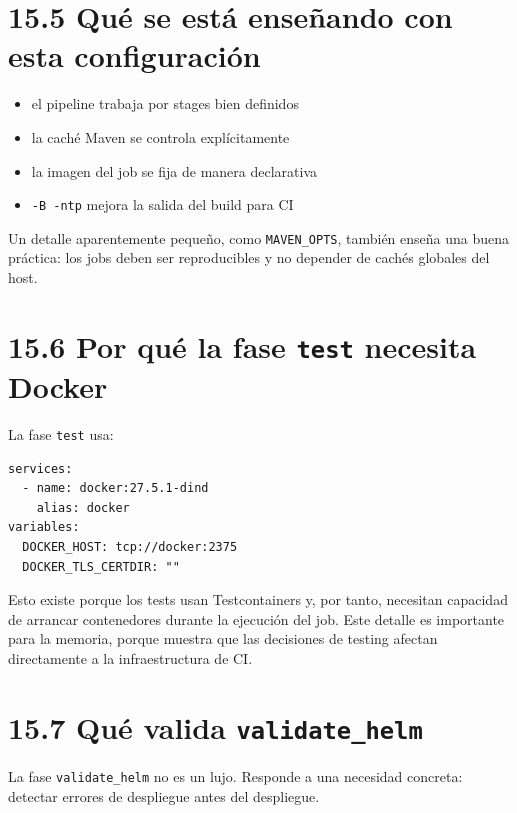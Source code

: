 \documentclass[
a4paper,
12pt]{report}
\providecommand{\tightlist}{%
  \setlength{\itemsep}{0pt}\setlength{\parskip}{0pt}}
\begin{document}
\section{15.5 Qué se está enseñando con esta
configuración}\label{quuxe9-se-estuxe1-enseuxf1ando-con-esta-configuraciuxf3n}

\begin{itemize}
\tightlist
\item
  el pipeline trabaja por stages bien definidos
\item
  la caché Maven se controla explícitamente
\item
  la imagen del job se fija de manera declarativa
\item
  \texttt{-B\ -ntp} mejora la salida del build para CI
\end{itemize}

Un detalle aparentemente pequeño, como \texttt{MAVEN\_OPTS}, también
enseña una buena práctica: los jobs deben ser reproducibles y no
depender de cachés globales del host.

\section{\texorpdfstring{15.6 Por qué la fase \texttt{test} necesita
Docker}{15.6 Por qué la fase test necesita Docker}}\label{por-quuxe9-la-fase-test-necesita-docker}

La fase \texttt{test} usa:

\begin{verbatim}
services:
  - name: docker:27.5.1-dind
    alias: docker
variables:
  DOCKER_HOST: tcp://docker:2375
  DOCKER_TLS_CERTDIR: ""
\end{verbatim}

Esto existe porque los tests usan Testcontainers y, por tanto, necesitan
capacidad de arrancar contenedores durante la ejecución del job. Este
detalle es importante para la memoria, porque muestra que las decisiones
de testing afectan directamente a la infraestructura de CI.

\section{\texorpdfstring{15.7 Qué valida
\texttt{validate\_helm}}{15.7 Qué valida validate\_helm}}\label{quuxe9-valida-validate_helm}

La fase \texttt{validate\_helm} no es un lujo. Responde a una necesidad
concreta: detectar errores de despliegue antes del despliegue.
\end{document}
